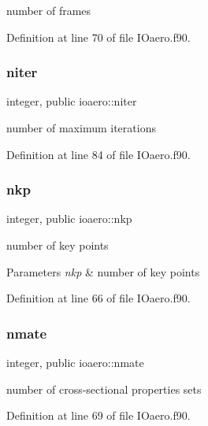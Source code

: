 number of frames 



Definition at line 70 of file I\+Oaero.\+f90.

\mbox{\label{namespaceioaero_ac008486fd12e0029a1ef77b3ca5e12c3}} 
\subsubsection{\texorpdfstring{niter}{niter}}
{\footnotesize\ttfamily integer, public ioaero\+::niter}



number of maximum iterations 



Definition at line 84 of file I\+Oaero.\+f90.

\mbox{\label{namespaceioaero_a24506866304c39bd1fa57ef73b124335}} 
\subsubsection{\texorpdfstring{nkp}{nkp}}
{\footnotesize\ttfamily integer, public ioaero\+::nkp}



number of key points 


\begin{DoxyParams}{Parameters}
{\em nkp} & number of key points \\
\hline
\end{DoxyParams}


Definition at line 66 of file I\+Oaero.\+f90.

\mbox{\label{namespaceioaero_ad8817641275f11b821b7720a78651531}} 
\subsubsection{\texorpdfstring{nmate}{nmate}}
{\footnotesize\ttfamily integer, public ioaero\+::nmate}



number of cross-\/sectional properties sets 



Definition at line 69 of file I\+Oaero.\+f90.

